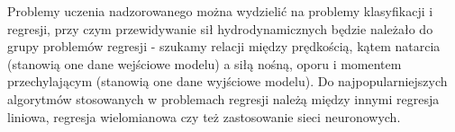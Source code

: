 Problemy uczenia nadzorowanego można wydzielić na problemy klasyfikacji i regresji\cite{ibm-ml-1}, przy czym przewidywanie sił hydrodynamicznych będzie należało do grupy problemów regresji - szukamy relacji między prędkością, kątem natarcia (stanowią one dane wejściowe modelu) a siłą nośną, oporu i momentem przechylającym (stanowią one dane wyjściowe modelu). Do najpopularniejszych algorytmów stosowanych w problemach regresji należą między innymi regresja liniowa, regresja wielomianowa czy też zastosowanie sieci neuronowych.